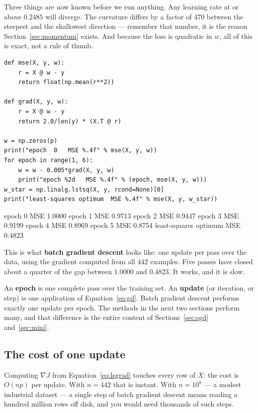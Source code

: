 \documentclass[11pt]{article}
\begin{document}
Three things are now known before we run anything. Any learning rate at or
above $0.2485$ will diverge. The curvature differs by a factor of $470$ between
the steepest and the shallowest direction --- remember that number, it is the
reason Section~\ref{sec:momentum} exists. And because the loss is quadratic in
$w$, all of this is exact, not a rule of thumb.

\begin{lstlisting}
def mse(X, y, w):
    r = X @ w - y
    return float(np.mean(r**2))

def grad(X, y, w):
    r = X @ w - y
    return 2.0/len(y) * (X.T @ r)

w = np.zeros(p)
print("epoch  0   MSE %.4f" % mse(X, y, w))
for epoch in range(1, 6):
    w = w - 0.005*grad(X, y, w)
    print("epoch %2d   MSE %.4f" % (epoch, mse(X, y, w)))
w_star = np.linalg.lstsq(X, y, rcond=None)[0]
print("least-squares optimum  MSE %.4f" % mse(X, y, w_star))
\end{lstlisting}
\begin{codeout}
epoch  0   MSE 1.0000
epoch  1   MSE 0.9713
epoch  2   MSE 0.9447
epoch  3   MSE 0.9199
epoch  4   MSE 0.8969
epoch  5   MSE 0.8754
least-squares optimum  MSE 0.4823
\end{codeout}

This is what \textbf{batch gradient descent} looks like: one update per pass
over the data, using the gradient computed from all $442$ examples. Five passes
have closed about a quarter of the gap between $1.0000$ and $0.4823$. It works,
and it is slow.

\begin{keyidea}
An \textbf{epoch} is one complete pass over the training set. An
\textbf{update} (or iteration, or step) is one application of
Equation~\eqref{eq:gd}. Batch gradient descent performs exactly one update per
epoch. The methods in the next two sections perform many, and that difference
is the entire content of Sections~\ref{sec:sgd} and~\ref{sec:mini}.
\end{keyidea}

\subsection{The cost of one update}

Computing $\nabla J$ from Equation~\eqref{eq:lsgrad} touches every row of $X$:
the cost is $O(np)$ per update. With $n = 442$ that is instant. With
$n = 10^8$ --- a modest industrial dataset --- a single step of batch gradient
descent means reading a hundred million rows off disk, and you would need
thousands of such steps.
\end{document}
